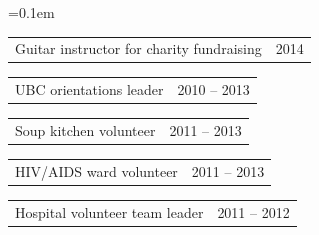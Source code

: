 \documentclass[10pt,letterpaper]{article}
\makeatletter
\newcommand{\headerrow}[2]
{\begin{tabular*}{\linewidth}{l@{\extracolsep{\fill}}r}
	#1 &
	#2 \\
\end{tabular*}}
\makeatother
\begin{document}
\begin{itemize*}
	\parskip=0.1em
	\item 
	\headerrow
		{{Guitar instructor for charity fundraising}}
		{{2014}}
	\item 
	\headerrow
		{{UBC orientations leader}}
		{{2010 -- 2013}}
	\item 
	\headerrow
		{{Soup kitchen volunteer}}
		{{2011 -- 2013}}
	\item 
	\headerrow
		{{HIV/AIDS ward volunteer}}
		{{2011 -- 2013}}
	\item 
	\headerrow
		{{Hospital volunteer team leader}}
		{{2011 -- 2012}}
\end{itemize*}
\vspace{-0.4em}
\end{document}

